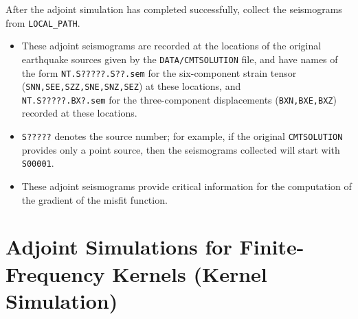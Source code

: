 \begin{enumerate}
After the adjoint simulation has completed successfully, collect the
seismograms from \texttt{LOCAL\_PATH}.
\begin{itemize}
\item These adjoint seismograms are recorded at the locations of the original
earthquake sources given by the \texttt{DATA/CMTSOLUTION} file, and
have names of the form \texttt{NT.S?????.S??.sem} for the six-component
strain tensor (\texttt{SNN,SEE,SZZ,SNE,SNZ,SEZ}) at these locations,
and ~\\
 \texttt{NT.S?????.BX?.sem} for the three-component displacements
(\texttt{BXN,BXE,BXZ}) recorded at these locations.
\item \texttt{S?????} denotes the source number; for example, if the original
\texttt{CMTSOLUTION} provides only a point source, then the seismograms
collected will start with \texttt{S00001}.
\item These adjoint seismograms provide critical information for the computation
of the gradient of the misfit function.
\end{itemize}
\end{enumerate}



\section{Adjoint Simulations for Finite-Frequency Kernels (Kernel Simulation)}\label{sec:Adjoint-simulation-finite}

